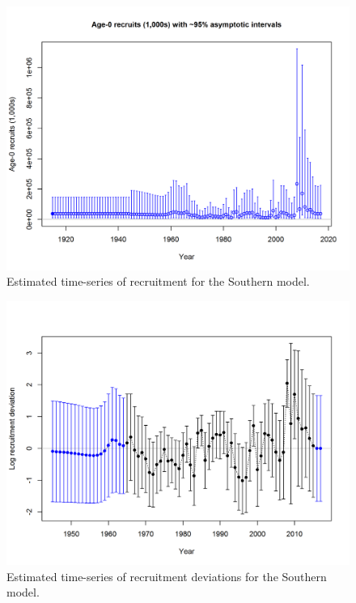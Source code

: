 \documentclass[12pt,]{article}
\begin{document}
\FloatBarrier

\begin{figure}[htbp]
\centering
\includegraphics{r4ss/plots_mod2/ts11_Age-0_recruits_(1000s)_with_95_asymptotic_intervals.png}
\caption{Estimated time-series of recruitment for the Southern model.
\label{fig:recruits1}}
\end{figure}

\FloatBarrier

\begin{figure}[htbp]
\centering
\includegraphics{r4ss/plots_mod2/recdevs2_withbars.png}
\caption{Estimated time-series of recruitment deviations for the
Southern model. \label{fig:recdevs1}}
\end{figure}
\end{document}
